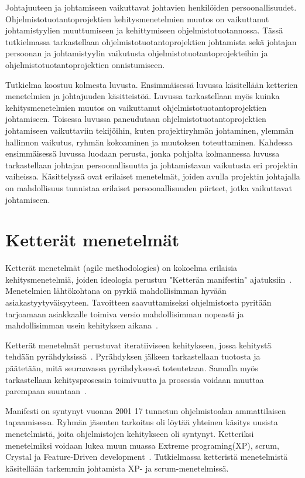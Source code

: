 \documentclass[finnish]{tktltiki2}
\theoremstyle{definition}
\theoremstyle{remark}
\begin{document}
Johtajuuteen ja johtamiseen vaikuttavat johtavien henkilöiden persoonallisuudet. Ohjelmistotuotantoprojektien kehitysmenetelmien muutos on vaikuttanut johtamistyylien muuttumiseen ja kehittymiseen ohjelmistotuotannossa. Tässä tutkielmassa tarkastellaan ohjelmistotuotantoprojektien johtamista sekä johtajan persoonan ja johtamistyylin vaikutusta ohjelmistotuotantoprojekteihin ja ohjelmistotuotantoprojektien onnistumiseen.

Tutkielma koostuu kolmesta luvusta. Ensimmäisessä luvussa käsitellään ketterien menetelmien ja johtajuuden käsitteistöä. Luvussa tarkastellaan myös kuinka kehitysmenetelmien muutos on vaikuttanut ohjelmistotuotantoprojektien johtamiseen. Toisessa luvussa paneudutaan ohjelmistotuotantoprojektien johtamiseen vaikuttaviin tekijöihin, kuten projektiryhmän johtaminen, ylemmän hallinnon vaikutus, ryhmän kokoaminen ja muutoksen toteuttaminen. Kahdessa ensimmäisessä luvussa luodaan perusta, jonka pohjalta kolmannessa luvussa tarkastellaan johtajan persoonallisuutta ja johtamistavan vaikutusta eri projektin vaiheissa. Käsittelyssä ovat erilaiset menetelmät, joiden avulla projektin johtajalla on mahdollisuus tunnistaa erilaiset persoonallisuuden piirteet, jotka vaikuttavat johtamiseen.  

\section{Ketterät menetelmät}

Ketterät menetelmät (agile methodologies) on kokoelma erilaisia kehitysmenetelmiä, joiden ideologia perustuu "Ketterän manifestin" ajatuksiin~\cite{fowler2001agile}. Menetelmien lähtökohtana on pyrkiä mahdollisimman hyvään asiakastyytyväisyyteen. Tavoitteen saavuttamiseksi ohjelmistosta pyritään tarjoamaan asiakkaalle toimiva versio mahdollisimman nopeasti ja mahdollisimman usein kehityksen aikana~\cite{fowler2001agile}.

Ketterät menetelmät perustuvat iteratiiviseen kehitykseen, jossa kehitystä tehdään pyrähdyksissä~\cite{cohen2004introduction}. Pyrähdyksen jälkeen tarkastellaan tuotosta ja päätetään, mitä seuraavassa pyrähdyksessä toteutetaan. Samalla myös tarkastellaan kehitysprosessin toimivuutta ja prosessia voidaan muuttaa parempaan suuntaan~\cite{cohen2004introduction}.

Manifesti on syntynyt vuonna 2001 17 tunnetun ohjelmistoalan ammattilaisen tapaamisessa. Ryhmän jäsenten tarkoitus oli löytää yhteinen käsitys uusista menetelmistä, joita ohjelmistojen kehitykseen oli syntynyt. Ketteriksi menetelmiksi voidaan lukea muun muassa Extreme programing(XP), scrum, Crystal ja Feature-Driven development~\cite{fowler2001agile}. Tutkielmassa ketteristä menetelmistä käsitellään tarkemmin johtamista XP- ja scrum-menetelmissä.
\end{document}
